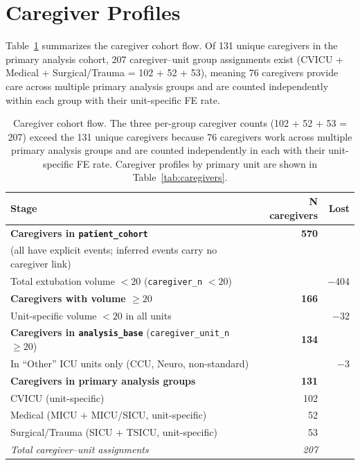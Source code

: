 \documentclass[11pt]{article}
\begin{document}
\section{Caregiver Profiles}

Table~\ref{tab:caregiver_flow} summarizes the caregiver cohort flow. Of
131 unique caregivers in the primary analysis cohort, 207 caregiver--unit
group assignments exist (CVICU + Medical + Surgical/Trauma = 102 + 52 + 53),
meaning 76 caregivers provide care across multiple primary analysis groups
and are counted independently within each group with their unit-specific
FE rate.

\begin{table}[h!]
\centering
\begin{tabular}{lrr}
\toprule
Stage & N caregivers & Lost \\
\midrule
\textbf{Caregivers in \texttt{patient\_cohort}} & \textbf{570} & \\
\quad (all have explicit events; inferred events carry no caregiver link) & & \\
\addlinespace
\quad Total extubation volume $< 20$ (\texttt{caregiver\_n} $< 20$) & & $-404$ \\
\midrule
\textbf{Caregivers with volume $\geq 20$} & \textbf{166} & \\
\addlinespace
\quad Unit-specific volume $< 20$ in all units & & $-32$ \\
\midrule
\textbf{Caregivers in \texttt{analysis\_base}} (\texttt{caregiver\_unit\_n} $\geq 20$) & \textbf{134} & \\
\addlinespace
\quad In ``Other'' ICU units only (CCU, Neuro, non-standard) & & $-3$ \\
\midrule
\textbf{Caregivers in primary analysis groups} & \textbf{131} & \\
\quad CVICU (unit-specific) & 102 & \\
\quad Medical (MICU + MICU/SICU, unit-specific) & 52 & \\
\quad Surgical/Trauma (SICU + TSICU, unit-specific) & 53 & \\
\addlinespace
\quad \textit{Total caregiver--unit assignments} & \textit{207} & \\
\bottomrule
\end{tabular}
\caption{Caregiver cohort flow. The three per-group caregiver counts
(102 + 52 + 53 = 207) exceed the 131 unique caregivers because 76
caregivers work across multiple primary analysis groups and are counted
independently in each with their unit-specific FE rate.
Caregiver profiles by primary unit are shown in Table~\ref{tab:caregivers}.}
\label{tab:caregiver_flow}
\end{table}
\end{document}
